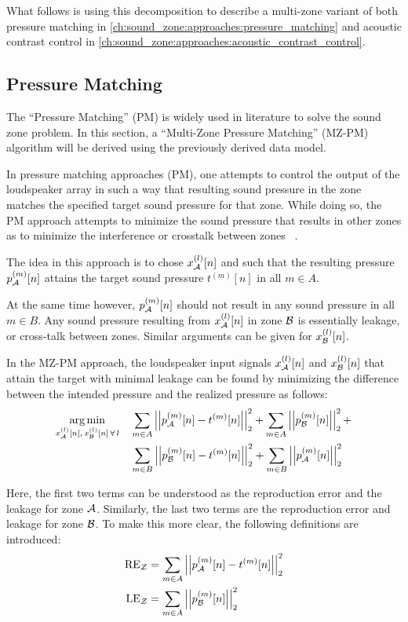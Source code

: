 What follows is using this decomposition to describe a multi-zone variant of both pressure matching in \autoref{ch:sound_zone:approaches:pressure_matching}
and acoustic contrast control in \autoref{ch:sound_zone:approaches:acoustic_contrast_control}.

\subsection{Pressure Matching}
\label{ch:sound_zone:approaches:pressure_matching}
The ``Pressure Matching'' (PM) is widely used in literature to solve the sound zone problem.
In this section, a ``Multi-Zone Pressure Matching'' (MZ-PM) algorithm will be derived using the previously derived data model.

In pressure matching approaches (PM), one attempts to control the output of the loudspeaker array in such a way that resulting sound pressure in the zone 
matches the specified target sound pressure for that zone.
While doing so, the PM approach attempts to minimize the sound pressure that results in other zones as to minimize the interference or crosstalk between zones
~\cite{olik2013comparative, betlehem2015personal}.

The idea in this approach is to chose $x_{\mathcal{A}}^{(l)}[n]$ and such that the resulting pressure $p_{\mathcal{A}}^{(m)}[n]$ attains the target sound pressure $t^{(m)}[n]$ in all $m \in A$.   

At the same time however, $p_{\mathcal{A}}^{(m)}[n]$ should not result in any sound pressure in all $m \in B$.
Any sound pressure resulting from $x_{\mathcal{A}}^{(l)}[n]$ in zone $\mathcal{B}$ is essentially leakage, or cross-talk between zones. 
Similar arguments can be given for $x_{\mathcal{B}}^{(l)}[n]$.

In the MZ-PM approach, the loudspeaker input signals $x_{\mathcal{A}}^{(l)}[n]$ and $x_{\mathcal{B}}^{(l)}[n]$ that attain the target with minimal leakage can be found by 
minimizing the difference between the intended pressure and the realized pressure as follows:
\begin{align}
    \argmin{x_\za^{(l)}[n],\,x_\zb^{(l)}[n]\,\forall\,l}{
       &\sum_{m\in A} \norm[2][2]{p_\za^{(m)}[n] - t^{(m)}[n]} +
        \sum_{m\in A} \norm[2][2]{p_\zb^{(m)}[n]} + \\
       &\sum_{m\in B} \norm[2][2]{p_\zb^{(m)}[n] - t^{(m)}[n]} + 
        \sum_{m\in B} \norm[2][2]{p_\za^{(m)}[n]}
    }
\end{align}

Here, the first two terms can be understood as the reproduction error and the leakage for zone $\mathcal{A}$.
Similarly, the last two terms are the reproduction error and leakage for zone $\mathcal{B}$. 
To make this more clear, the following definitions are introduced:
\begin{align}
    \text{RE}_\zz &= \sum_{m\in A} \norm[2][2]{p_\za^{(m)}[n] - t^{(m)}[n]} \\
    \text{LE}_\zz &= \sum_{m\in A} \norm[2][2]{p_\zb^{(m)}[n]} 
\end{align}

